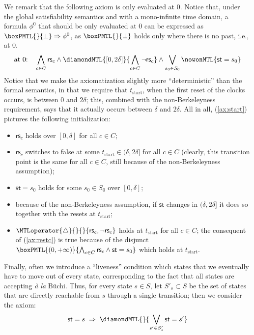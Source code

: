 \documentclass[a4paper]{article}
\newcommand{\tstart}{t_{\mathrm{start}}}
\newcommand{\frf}[1]{(\ref{#1})}
\newcommand{\logicfalse}{\bot}
\newcommand{\st}{\mathsf{st}}
\newcommand{\rest}[1]{\mathsf{rs}_{#1}}
\newcommand{\becomesMTL}[1]{\MTLoperator{\triangle}{}{}{#1}}
\theoremstyle{plain}
\theoremstyle{definition}
\begin{document}
We remark that the following axiom is only evaluated at $0$.
Notice that, under the global satisfiability semantics and with a mono-infinite time domain, a formula $\phi^0$ that should be only evaluated at $0$ can be expressed as $\boxPMTL{}{\logicfalse{}} \Rightarrow \phi^0$, as $\boxPMTL{}{\logicfalse{}}$ holds only where there is no past, i.e., at $0$.
\begin{equation} \label{ax:start}
  \text{at $0$:}\quad \bigwedge_{c \in C} \rest{c} \wedge \diamondMTL{[0,2\delta]}{\bigwedge_{c \in C}\neg\rest{c}}
                      \wedge \bigvee_{s_0 \in S_0} \nowonMTL{\st = s_0}
\end{equation}
Notice that we make the axiomatization slightly more ``deterministic'' than the formal semantics, in that we require that $\tstart$, when the first reset of the clocks occurs, is between $0$ and $2\delta$; this, combined with the non-Berkeleyness requirement, says that it actually occurs between $\delta$ and $2\delta$.
All in all, \frf{ax:start} pictures the following initialization:
\begin{itemize}
  \item $\rest{c}$ holds over $[0,\delta]$ for all $c \in C$;
  \item $\rest{c}$ switches to false at some $\tstart \in (\delta, 2\delta]$ for all $c \in C$ (clearly, this transition point is the same for all $c \in C$, still because of the non-Berkeleyness assumption);
  \item $\st = s_0$ holds for some $s_0 \in S_0$ over $[0,\delta]$;
  \item because of the non-Berkeleyness assumption, if $\st$ changes in $(\delta, 2\delta]$ it does so together with the resets at $\tstart$;
  \item $\becomesMTL{\rest{c}, \neg \rest{c}}$ holds at $\tstart$ for all $c \in C$; the consequent of \frf{ax:restc} is true because of the disjunct $\boxPMTL{(0, +\infty)}{\bigwedge_{c \in C} \rest{c} \wedge \st = s_0}$ which holds at $\tstart$.
\end{itemize}


Finally, often we introduce a ``liveness'' condition which states that we eventually have to move out of every state, corresponding to the fact that all states are accepting \emph{\`a la} B\"uchi.
Thus, for every state $s \in S$, let $S'_s \subset S$ be the set of states that are directly reachable from $s$ through a single transition; then we consider the axiom:
\begin{equation} \label{ax:liveness}
  \st = s \;\Rightarrow\; \diamondMTL{}{\bigvee_{s' \in S'_s} \st = s'}
\end{equation}
\end{document}
